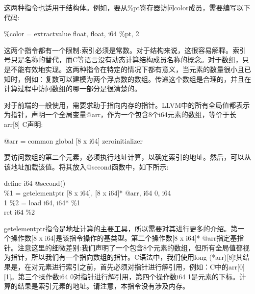 这两种指令也适用于结构体。例如，要从\%pt寄存器访问color成员，需要编写以下代码:\par

\begin{tcolorbox}[colback=white,colframe=black]
\%color = extractvalue { float, float, i64 } \%pt, 2
\end{tcolorbox}

这两个指令都有一个限制:索引必须是常数。对于结构来说，这很容易解释。索引号只是名称的替代，而C等语言没有动态计算结构成员名称的概念。对于数组，只是不能有效地实现。这两种指令在特定的情况下都有意义，当元素的数量很小且已知时，例如：复数可以建模为两个浮点数的数组。传递这个数组是合理的，并且在计算过程中访问数组的哪一部分是很清楚的。\par

对于前端的一般使用，需要求助于指向内存的指针。LLVM中的所有全局值都表示为指针，声明一个全局变量@arr，作为一个包含8个i64元素的数组，等价于长arr[8] C声明:\par

\begin{tcolorbox}[colback=white,colframe=black]
@arr = common global [8 x i64] zeroinitializer
\end{tcolorbox}

要访问数组的第二个元素，必须执行地址计算，以确定索引的地址。然后，可以从该地址加载该值。将其放入@second函数中，如下所示:\par

\begin{tcolorbox}[colback=white,colframe=black]
define i64 @second() { \\
\hspace*{0.5cm}\%1 = getelementptr [8 x i64], [8 x i64]* @arr, i64 0, i64 \\
\hspace*{0.5cm}1
\hspace*{0.5cm}\%2 = load i64, i64* \%1 \\
\hspace*{0.5cm}ret i64 \%2 \\
}
\end{tcolorbox}

getelementptr指令是地址计算的主要工具，所以需要对其进行更多的介绍。第一个操作数[8 x i64]是该指令操作的基类型。第二个操作数[8 x i64]* @arr指定基指针。注意这里的细微差别:我们声明了一个包含8个元素的数组，但所有全局值都视为指针，所以我们有一个指向数组的指针。C语法中，我们使用long (*arr)[8]!其结果是，在对元素进行索引之前，首先必须对指针进行解引用，例如：C中的arr[0][1]。第三个操作数i64 0对指针进行解引用，第四个操作数i64 1是元素的下标。计算的结果是索引元素的地址。请注意，本指令没有涉及内存。\par

